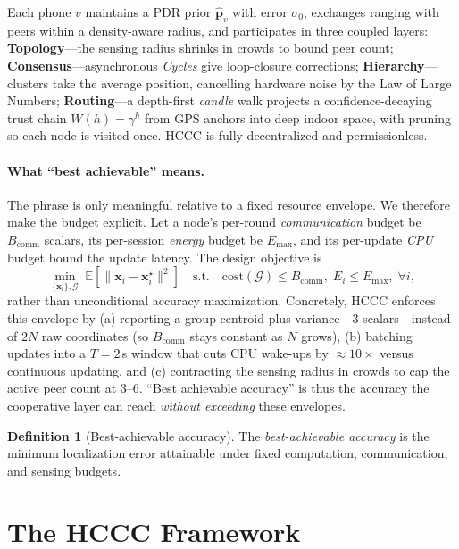 \documentclass{ceurart}
\theoremstyle{definition}
\newtheorem{definition}{Definition}
\begin{document}
Each phone $v$ maintains a PDR prior $\hat{\mathbf p}_v$ with error $\sigma_0$,
exchanges ranging with peers within a density-aware radius, and participates in three
coupled layers: \textbf{Topology}---the sensing radius shrinks in crowds to bound
peer count; \textbf{Consensus}---asynchronous \emph{Cycles} give loop-closure
corrections; \textbf{Hierarchy}---clusters take the average position, cancelling
hardware noise by the Law of Large Numbers; \textbf{Routing}---a depth-first
\emph{candle} walk projects a confidence-decaying trust chain $W(h)=\gamma^{h}$ from
GPS anchors into deep indoor space, with pruning so each node is visited once. HCCC
is fully decentralized and permissionless.

\paragraph{What ``best achievable'' means.}
The phrase is only meaningful relative to a fixed resource envelope. We therefore
make the budget explicit. Let a node's per-round \emph{communication} budget be
$B_{\mathrm{comm}}$ scalars, its per-session \emph{energy} budget be $E_{\max}$, and
its per-update \emph{CPU} budget bound the update latency. The design objective is
\begin{equation}
\min_{\{\mathbf{x}_i\}, \mathcal{G}} \;
\mathbb{E}\!\left[\|\mathbf{x}_i-\mathbf{x}_i^\star\|^2\right]
\quad\text{s.t.}\quad
\mathrm{cost}(\mathcal{G}) \le B_{\mathrm{comm}},\;
E_i \le E_{\max},\;\forall i,
\label{eq:objective}
\end{equation}
rather than unconditional accuracy maximization. Concretely, HCCC enforces this
envelope by (a) reporting a group centroid plus variance---$3$ scalars---instead of
$2N$ raw coordinates (so $B_{\mathrm{comm}}$ stays constant as $N$ grows), (b)
batching updates into a $T=2$\,s window that cuts CPU wake-ups by $\approx10\times$
versus continuous updating, and (c) contracting the sensing radius in crowds to cap
the active peer count at $3$--$6$. ``Best achievable accuracy'' is thus the accuracy
the cooperative layer can reach \emph{without exceeding} these envelopes.

\begin{definition}[Best-achievable accuracy]
The \emph{best-achievable accuracy} is the minimum localization error attainable
under fixed computation, communication, and sensing budgets.
\end{definition}

\section{The HCCC Framework}
\label{sec:framework}
\end{document}
